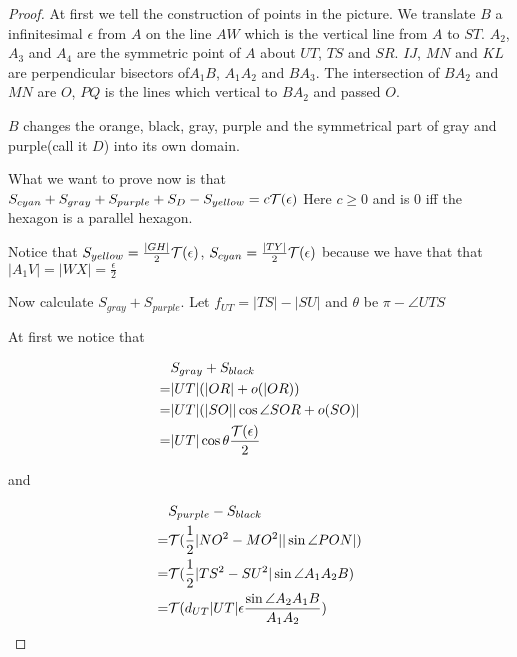 \begin{proof}
	At first we tell the construction of points in the picture.
	We translate $B$ a infinitesimal $\epsilon$ from $A$ on the line $AW$
	which is the vertical line from $A$ to $ST$. $A_2$, $A_3$ and $A_4$ are
	the symmetric point of $A$ about $UT$, $TS$ and $SR$. $IJ$, $MN$ and 
	$KL$ are perpendicular bisectors of$A_1B$, $A_1A_2$ and $BA_3$. 
	The intersection of $BA_2$ and $MN$ are $O$, $PQ$ is the lines which 
	vertical to $BA_2$ and passed $O$.
	
	$B$ changes the orange, black, gray, purple and the symmetrical part
	of gray and purple(call it $D$) into its own domain. 
	
	What we want to prove now is that $S_{cyan} + S_{gray} +
	S_{purple} + S_{D} - S_{yellow} = c\mathcal{T}(\epsilon) $ 
	Here $c\geq0$ and is $0$ iff the
	hexagon is a parallel hexagon.
	
	Notice that $S_{yellow} = \frac{|GH|}{2}\mathcal{T}(\epsilon)$, $S_{cyan} = \frac{|TY|}{2}\mathcal{T}(\epsilon)$ because we have that that $|A_1V| = |WX| = \frac{\epsilon}{2}$
	
	Now calculate $S_{gray}+S_{purple}$. Let $f_{UT} = |TS| - |SU|$ 
	and $\theta$ be $\pi - \angle UTS$
	
	At first we notice that 
	
	\begin{equation}
	\begin{split}
	&S_{gray} + S_{black}\\
	=&|UT|(|OR| + o(|OR))\\
	=&|UT|(|SO||\cos \angle SOR + o(SO)|\\
	=&|UT|\cos\theta \frac{\mathcal{T}(\epsilon)}{2}
	\end{split}
	\end{equation}
	
	and	
	
	\begin{equation}
	\begin{split}
	&S_{purple} - S_{black}\\
	=&\mathcal{T}(\frac{1}{2}|NO^2 - MO^2||\sin\angle PON|)\\
	=&\mathcal{T}(\frac{1}{2}|TS^2 - SU^2|\sin \angle A_1A_2B)\\
	=&\mathcal{T}(d_{UT}|UT|\epsilon\frac{\sin \angle A_2A_1B}{A_1A_2})
	\end{split}
	\end{equation}
	

\end{proof}
